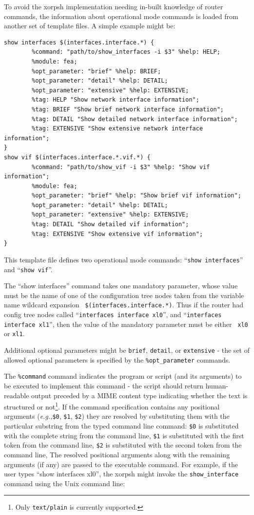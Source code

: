 \documentclass[11pt]{article}
\newcommand{\eg}{\emph{e.g.,}\xspace}
\begin{document}
To avoid the xorpsh implementation needing in-built knowledge of
router commands, the information about operational mode commands is
loaded from another set of template files.  A simple example might be:

\begin{verbatim}
show interfaces $(interfaces.interface.*) {
        %command: "path/to/show_interfaces -i $3" %help: HELP;
        %module: fea;
        %opt_parameter: "brief" %help: BRIEF;
        %opt_parameter: "detail" %help: DETAIL;
        %opt_parameter: "extensive" %help: EXTENSIVE;
        %tag: HELP "Show network interface information";
        %tag: BRIEF "Show brief network interface information";
        %tag: DETAIL "Show detailed network interface information";
        %tag: EXTENSIVE "Show extensive network interface information";
}
show vif $(interfaces.interface.*.vif.*) {
        %command: "path/to/show_vif -i $3" %help: "Show vif information";
        %module: fea;
        %opt_parameter: "brief" %help: "Show brief vif information";
        %opt_parameter: "detail" %help: DETAIL;
        %opt_parameter: "extensive" %help: EXTENSIVE;
        %tag: DETAIL "Show detailed vif information";
        %tag: EXTENSIVE "Show extensive vif information";
}
\end{verbatim}

This template file defines two operational mode commands:
``{\tt show interfaces}'' and ``{\tt show vif}''.

The ``show interfaces'' command takes one mandatory parameter, whose
value must be the name of one of the configuration tree nodes taken
from the variable name wildcard expansion {\tt
\$(interfaces.interface.*)}.  Thus if the router had config tree nodes
called ``{\tt interfaces interface xl0}'', and ``{\tt interfaces interface
xl1}'', then the value of the mandatory parameter must be either {\tt
xl0} or {\tt xl1}.

Additional optional parameters might be {\tt brief}, {\tt detail}, or
{\tt extensive} - the set of allowed optional parameters is specified
by the {\tt \%opt\_parameter} commands.

The {\tt \%command} command indicates the program or script (and its
arguments) to be
executed to implement this command - the script should return
human-readable output preceded by a MIME content type indicating
whether the text is structured or not\footnote{Only {\tt text/plain}
is currently supported.}.
If the command specification contains any positional arguments
(\eg {\tt \$0}, {\tt \$1}, {\tt \$2}) they are resolved by substituting
them with the particular substring from the typed command line command:
{\tt \$0} is substituted with the complete string from the command line,
{\tt \$1} is substituted with the first token from the command line,
{\tt \$2} is substituted with the second token from the command line,
The resolved positional arguments along with the remaining arguments
(if any) are passed to the executable command.
For example, if the user types ``show interfaces xl0'', the xorpsh might invoke
the {\tt show\_interface} command using the Unix command line:
\end{document}
